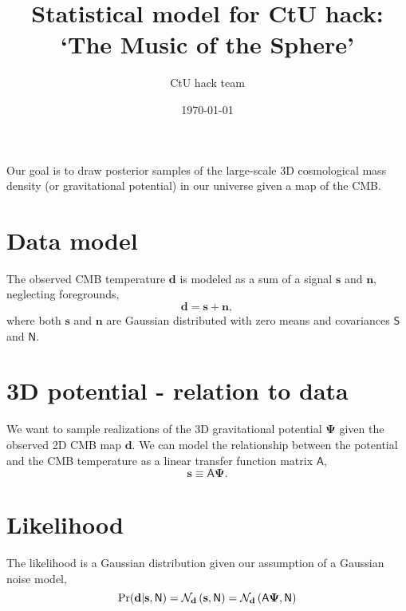\documentclass[11pt, letterpaper]{article}
\newcommand{\data}{\mathbf{d}}
\newcommand{\signal}{\mathbf{s}}
\newcommand{\noise}{\mathbf{n}}
\newcommand{\transfer}{\mathsf{A}}
\newcommand{\Smat}{\mathsf{S}}
\newcommand{\Nmat}{\mathsf{N}}
\newcommand{\gravpot}{\bm \Psi}
\newcommand{\normdist}{\mathcal{N}}
\def\pr{{\rm Pr}}
\begin{document}
  
\title{Statistical model for CtU hack: `The Music of the Sphere'}

\author{CtU hack team}

\date{\today}

\maketitle


Our goal is to draw posterior samples of the large-scale 3D cosmological mass 
density (or gravitational potential) in our universe given a map of the CMB. 

\section{Data model}
The observed CMB temperature $\data$ is modeled as a sum of a signal $\signal$
and $\noise$, neglecting foregrounds,
\begin{equation}
	\data = \signal + \noise,
\end{equation}
where both $\signal$ and $\noise$ are Gaussian distributed with zero means 
and covariances $\Smat$ and $\Nmat$.

\section{3D potential - relation to data}
We want to sample realizations of the 3D gravitational potential $\gravpot$
given the observed 2D CMB map $\data$. We can model the relationship between 
the potential and the CMB temperature as a linear transfer function matrix 
$\transfer$,
\begin{equation}
	\signal \equiv \transfer \gravpot.
\end{equation}


\section{Likelihood}
The likelihood is a Gaussian distribution given our assumption of a 
Gaussian noise model,
\begin{equation}
	\pr(\data | \signal, \Nmat) = \normdist_{\data} 
	\left(\signal, \Nmat\right)
	= \normdist_{\data} \left(\transfer \gravpot, \Nmat\right)
\end{equation}
\end{document}
